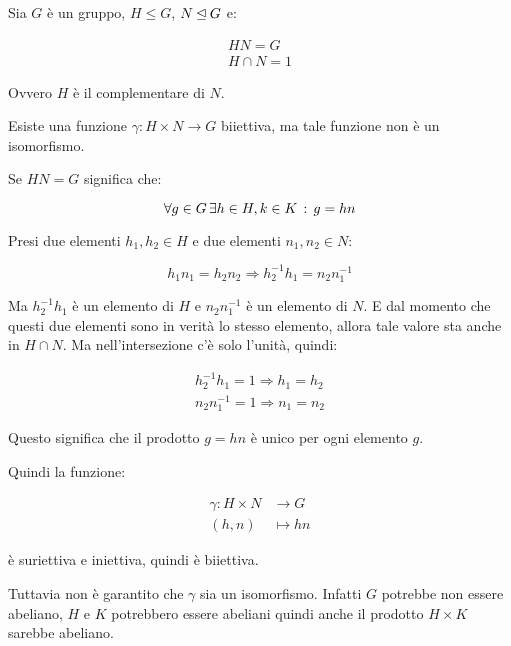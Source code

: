 \begin{esercizio}
	Sia $G$ è un gruppo, $H \le G$, $N \unlhd G$ e:
	
	\begin{gather}
		HN = G \\
		H \cap N = 1
	\end{gather}

	Ovvero $H$ è il complementare di $N$.
	
	Esiste una funzione $\gamma: H \times N \longrightarrow G$ biiettiva, ma tale funzione non è un isomorfismo.
\end{esercizio}
\begin{soluzione}
	Se $HN = G$ significa che:
	
	\begin{equation*}
		\forall g \in G \, \exists h \in H, k \in K \,:\, g = hn
	\end{equation*}

	Presi due elementi $h_1, h_2 \in H$ e due elementi $n_1, n_2 \in N$:
	
	\begin{equation*}
		h_1n_1 = h_2n_2 \Longrightarrow h_2^{-1}h_1 = n_2n_1^{-1}
	\end{equation*}

	Ma $h_2^{-1}h_1$ è un elemento di $H$ e $n_2n_1^{-1}$ è un elemento di $N$. E dal momento che questi due elementi sono in verità lo stesso elemento, allora tale valore sta anche in $H \cap N$. Ma nell'intersezione c'è solo l'unità, quindi:
	
	\begin{gather*}
		h_2^{-1}h_1 = 1 \Longrightarrow h_1 = h_2 \\
		n_2 n_1^{-1} = 1 \Longrightarrow n_1 = n_2
	\end{gather*}

	Questo significa che il prodotto $g = hn$ è unico per ogni elemento $g$.
	
	Quindi la funzione:
	
	\begin{align}
		\gamma: H \times N &\longrightarrow G \\
		(h, n) &\longmapsto hn
	\end{align}

	è suriettiva e iniettiva, quindi è biiettiva.
	
	Tuttavia non è garantito che $\gamma$ sia un isomorfismo.
	Infatti $G$ potrebbe non essere abeliano, $H$ e $K$ potrebbero essere abeliani quindi anche il prodotto $H \times K$ sarebbe abeliano.
	

\end{soluzione}

